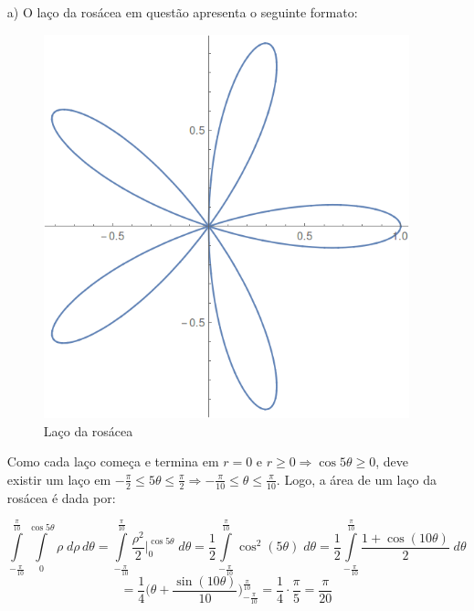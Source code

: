 \documentclass[12pt,a4paper]{article}
\begin{document}
\begin{itemize}
    \item[a)] O laço da rosácea em questão apresenta o seguinte formato:
    

\begin{figure}[h!]
	\centering
	\includegraphics[scale=0.40]{Fig1.png}  
	\caption{Laço da rosácea}
	\label{fig:figura1}
\end{figure}

Como cada laço começa e termina em $r=0$ e $r \geq 0 \Rightarrow \cos 5\theta \geq 0$, deve existir um laço em $-\frac{\pi}{2} \leq 5\theta \leq \frac{\pi}{2} \Rightarrow -\frac{\pi}{10} \leq \theta \leq \frac{\pi}{10}$. Logo, a área de um laço da rosácea é dada por:

$$ \int\limits_{-\frac{\pi}{10}}^{\frac{\pi}{10}} \int\limits_0^{\cos 5\theta} \rho \; d\rho \, d\theta = \int\limits_{-\frac{\pi}{10}}^{\frac{\pi}{10}} \frac{\rho^2}{2} \Big|_0^{\cos 5\theta} \; d\theta = \frac{1}{2} \int\limits_{-\frac{\pi}{10}}^{\frac{\pi}{10}} \cos^2(5\theta) \; d\theta = \frac{1}{2} \int\limits_{-\frac{\pi}{10}}^{\frac{\pi}{10}} \frac{1 + \cos (10\theta)}{2} \; d\theta $$
$$ = \frac{1}{4} \Big( \theta + \frac{\sin (10\theta)}{10} \Big)_{-\frac{\pi}{10}}^{\frac{\pi}{10}} = \frac{1}{4} \cdot \frac{\pi}{5} = \frac{\pi}{20} $$


\end{itemize}
\end{document}
